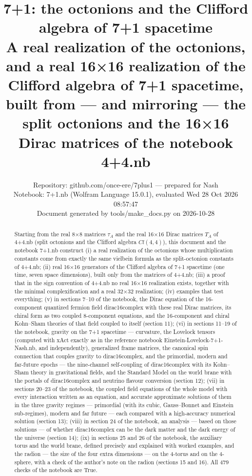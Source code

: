 \documentclass[10pt,a4paper]{article}
\begin{document}
\title{7+1: the octonions and the Clifford algebra of 7+1 spacetime\\[0.4em]\large A real realization of the octonions, and a real 16×16 realization of the Clifford algebra of 7+1 spacetime, built from — and mirroring — the split octonions and the 16×16 Dirac matrices of the notebook 4+4.nb}
\author{Repository: github.com/once-ere/7plus1 — prepared for Nash\\ Notebook: 7+1.nb (Wolfram Language 15.0.1), evaluated Wed 28 Oct 2026 08:57:47\\ Document generated by tools/make\_docs.py on 2026-10-28}
\date{}
\maketitle
\begin{abstract}
Starting from the real 8×8 matrices $\tau_A$ and the real 16×16 Dirac matrices $T_A$ of 4+4.nb (split octonions and the Clifford algebra $Cl(4,4)$), this document and the notebook 7+1.nb construct (i) a real realization of the octonions whose multiplication constants come from exactly the same vielbein formula as the split-octonion constants of 4+4.nb; (ii) real 16×16 generators of the Clifford algebra of 7+1 spacetime (one time, seven space dimensions), built only from the matrices of 4+4.nb; (iii) a proof that in the sign convention of 4+4.nb no real 16×16 realization exists, together with the minimal complexification and a real 32×32 realization; (iv) examples that test everything; (v) in sections 7–10 of the notebook, the Dirac equation of the 16-component quantized fermion field dirac16complex with these real Dirac matrices, its chiral form as two coupled 8-component equations, and the 16-component and chiral Kohn–Sham theories of that field coupled to itself (section 11); (vi) in sections 11–19 of the notebook, gravity on the 7+1 spacetime — curvature, the Lovelock tensors (computed with xAct exactly as in the reference notebook Einstein-Lovelock-7+1-Nash.nb, and independently), generalized frame matrices, the canonical spin connection that couples gravity to dirac16complex, and the primordial, modern and far-future epochs — the nine-channel self-coupling of dirac16complex with its Kohn–Sham theory in gravitational fields, and the Standard Model on the world brane with the portals of dirac16complex and neutrino flavour conversion (section 12); (vii) in sections 20–23 of the notebook, the coupled field equations of the whole model with every interaction written as an equation, and accurate approximate solutions of them in the three gravity regimes — primordial (with its cubic, Gauss–Bonnet and Einstein sub-regimes), modern and far future — each compared with a high-accuracy numerical solution (section 13); (viii) in section 24 of the notebook, an analysis — based on those solutions — of whether dirac16complex can be the dark matter and the dark energy of the universe (section 14); (ix) in sections 25 and 26 of the notebook, the auxiliary torus and the world brane, defined precisely and explained with worked examples, and the radion — the size of the four extra dimensions — on the 4-torus and on the 4-sphere, with a check of the author’s note on the radion (sections 15 and 16). All 479 checks of the notebook are True.
\end{abstract}
\end{document}
